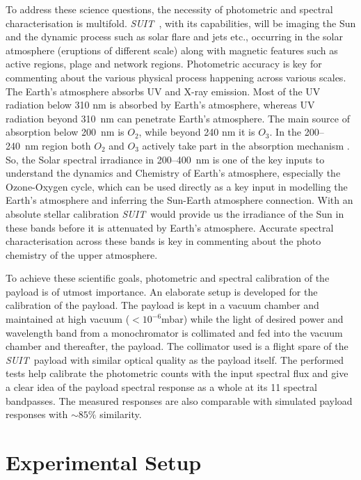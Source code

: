 \documentclass[12pt]{spieman}  %
\newcommand{\suit}{{\it SUIT~}}
\begin{document}
To address these science questions, the necessity of photometric and spectral characterisation is multifold.  \suit, with its capabilities, will be imaging the Sun and the dynamic process such as solar flare and jets etc., occurring in the solar atmosphere (eruptions of different scale) along with magnetic features such as active regions, plage and network regions. Photometric accuracy is key for commenting about the various physical process happening across various scales. The Earth's atmosphere absorbs UV and X-ray emission. Most of the UV radiation below 310 nm is absorbed by Earth's atmosphere, whereas UV radiation beyond 310~nm can penetrate Earth's atmosphere. The main source of absorption below 200~nm is $O_{2}$, while beyond 240 nm it is $O_{3}$. In the 200{--}240~nm region both $O_{2}$ and $O_{3}$ actively take part in the absorption mechanism \cite{haigh07}. So, the Solar spectral irradiance in 200{--}400~nm is one of the key inputs to understand the dynamics and Chemistry of Earth's atmosphere, especially the Ozone-Oxygen cycle, which can be used directly as a key input in modelling the Earth's atmosphere and inferring the Sun-Earth atmosphere connection. With an absolute stellar calibration \suit would provide us the irradiance of the Sun in these bands before it is attenuated by Earth's atmosphere. Accurate spectral characterisation across these bands is key in commenting about the photo chemistry of the upper atmosphere.

To achieve these scientific goals, photometric and spectral calibration of the payload is of utmost importance. An elaborate setup is developed for the calibration of the payload. The payload is kept in a vacuum chamber and maintained at high vacuum ($<10^{-6}$mbar) while the light of desired power and wavelength band from a monochromator is collimated and fed into the vacuum chamber and thereafter, the payload. The collimator used is a flight spare of the \suit payload with similar optical quality as the payload itself. The performed tests help calibrate the photometric counts with the input spectral flux and give a clear idea of the payload spectral response as a whole at its 11 spectral bandpasses. The measured responses are also comparable with simulated payload responses with $\sim 85\%$ similarity.

\section{Experimental Setup}\label{sec:setup}
\end{document}
